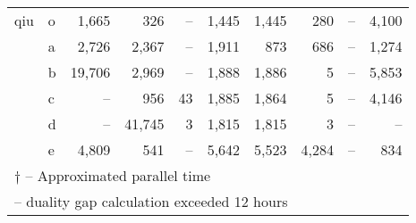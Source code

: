 \documentclass[11.5pt]{article}
\begin{document}
\begin{table}[H]
\begin{tabular}{l|l|rrr|rrrr|r}
qiu               & o & 1,665 & 326   & -- & 1,445  & 1,445 & 280   & --   & 4,100\\
                  & a & 2,726 & 2,367 & -- & 1,911  & 873   & 686   & --   & 1,274\\
                  & b & 19,706& 2,969 & -- & 1,888  & 1,886 & 5     & --   & 5,853\\
                  & c & --    & 956   & 43 & 1,885  & 1,864 & 5     & --   & 4,146\\
                  & d & --    & 41,745& 3  & 1,815  & 1,815 & 3     & --   & --\\
                  & e & 4,809 & 541   & -- & 5,642  & 5,523 & 4,284 & --   & 834\\
\bottomrule
\multicolumn{8}{l}{\scriptsize $\dagger$ -- Approximated parallel time}\\
\multicolumn{8}{l}{\scriptsize* -- duality gap calculation exceeded 12 hours}  
\end{tabular}
\end{table}
\end{document}

